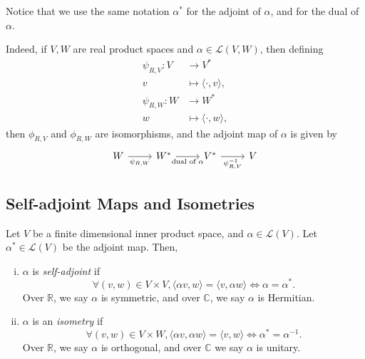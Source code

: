 \documentclass[12pt]{article}
\begin{document}
\begin{remark}
	Notice that we use the same notation $\alpha^{\ast}$ for the adjoint of $\alpha$, and for the dual of $\alpha$.

	Indeed, if $V, W$ are real product spaces and $\alpha \in \mathcal{L}(V, W)$, then defining
	\begin{align*}
		\psi_{R,V} : V &\to V^{\ast} \\
		v &\mapsto \langle \cdot, v \rangle, \\
		\psi_{R,W} : W &\to W^{\ast} \\
		w &\mapsto \langle \cdot, w \rangle,
	\end{align*}
	then $\phi_{R,V}$ and $\phi_{R,W}$ are isomorphisms, and the adjoint map of $\alpha$ is given by
	\[
		\begin{tikzcd}
			W \arrow[r, "{\psi_{R, W}}", swap] & W^{\ast} \arrow[r, "{\text{dual of } \alpha}", swap] & V^{\ast} \arrow[r, "{\psi_{R,V}^{-1}}", swap] & V
		\end{tikzcd}
	\] 
\end{remark}

\subsection{Self-adjoint Maps and Isometries}
\label{sub:self_adjoint_maps_and_isometries}

\begin{definition}
	Let $V$ be a finite dimensional inner product space, and $\alpha \in \mathcal{L}(V)$. Let $\alpha^{\ast} \in \mathcal{L}(V)$ be the adjoint map. Then,
	\begin{enumerate}[(i)]
		\item $\alpha$ is \textit{self-adjoint} if
			\[
			\forall (v, w) \in V \times V, \langle \alpha v, w \rangle = \langle v, \alpha w \rangle \iff \alpha = \alpha^{\ast}
		.\]
		Over $\mathbb{R}$, we say $\alpha$ is symmetric, and over $\mathbb{C}$, we say $\alpha$ is Hermitian.
	\item $\alpha$ is an \textit{isometry} if
		\[
		\forall (v, w) \in V \times W, \langle \alpha v, \alpha w \rangle = \langle v, w \rangle \iff \alpha^{\ast} = \alpha^{-1}
		.\]
		Over $\mathbb{R}$, we say $\alpha$ is orthogonal, and over $\mathbb{C}$ we say $\alpha$ is unitary.
	\end{enumerate}
\end{definition}
\end{document}
